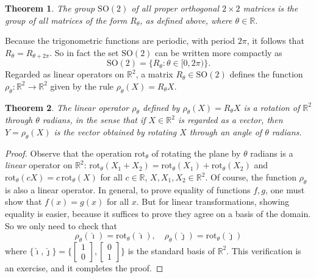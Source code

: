 \documentclass[11pt]{article}
\newtheorem{thm}{Theorem}[section]
\theoremstyle{definition}
\newcommand{\R}{\mathbb{R}} %
\newcommand{\SO}{\mathrm{SO}}
\begin{document}
\begin{thm}
  The group $\SO(2)$ of all proper orthogonal $2 \times 2$ matrices is
  the group of all matrices of the form $R_\theta$, as defined
  above, where $\theta \in \R$.
\end{thm}

Because the trigonometric functions are periodic, with period $2\pi$,
it follows that $R_\theta = R_{\theta+2\pi}$. So in fact the set
$\SO(2)$ can be written more compactly as
\[
  \SO(2) = \{ R_\theta : \theta \in [0, 2\pi) \}.
\]
Regarded as linear operators on $\R^2$, a matrix $R_\theta \in
\SO(2)$ defines the function $\rho_\theta: \R^2 \to \R^2$ given by the
rule $\rho_\theta(X) = R_\theta X$. 

\begin{thm}\label{thm:rotation}
  The linear operator $\rho_\theta$ defined by $\rho_\theta(X) =
  R_\theta X$ is a rotation of $\R^2$ through $\theta$ radians, in the
  sense that if $X \in \R^2$ is regarded as a vector, then
  $Y=\rho_\theta(X)$ is the vector obtained by rotating $X$ through an
  angle of $\theta$ radians.
\end{thm}

\begin{proof}
Observe that the operation $\text{rot}_\theta$ of rotating the plane
by $\theta$ radians is a \emph{linear} operator on $\R^2$:
$\text{rot}_\theta(X_1 + X_2) = \text{rot}_\theta(X_1) +
\text{rot}_\theta(X_2)$ and $\text{rot}_\theta(cX) = c\,
\text{rot}_\theta(X)$ for all $c \in \R$, $X,X_1, X_2 \in \R^2$. Of
course, the function $\rho_\theta$ is also a linear operator. In
general, to prove equality of functions $f,g$, one must show that
$f(x) = g(x)$ for all $x$. But for linear transformations, showing
equality is easier, because it suffices to prove they agree on a basis
of the domain. So we only need to check that
\[
  \rho_\theta(\hat{\imath}) = \text{rot}_\theta(\hat{\imath}), \quad
  \rho_\theta(\hat{\jmath}) = \text{rot}_\theta(\hat{\jmath})
\]
where $\{ \hat{\imath}, \hat{\jmath} \} = \{ [\begin{smallmatrix}
  1\\0 \end{smallmatrix}],  [\begin{smallmatrix}
  0\\1 \end{smallmatrix}] \}$ is the standard basis of $\R^2$.
This verification is an exercise, and it completes the proof. 
\end{proof}
\end{document}
